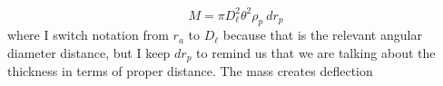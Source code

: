\begin{equation}
  M = \pi D_\ell^2 \theta^2 \rho_p\ dr_p
\end{equation}
where I switch notation from $r_a$ to $D_\ell$ because that is the relevant angular diameter distance, but I keep $dr_p$ to remind us that we are talking about the thickness in terms of proper distance.  The mass creates deflection